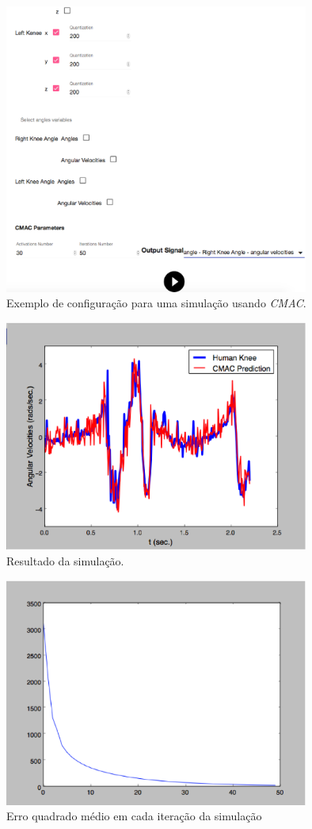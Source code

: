 \begin{figure}[ht]
	\centering
	\includegraphics[width=10cm]{figuras/tela31.eps}
	\caption{Exemplo de configuração para uma simulação usando \emph{CMAC}.}
\label{tela31}
\end{figure}

\begin{figure}[ht]
	\centering
	\includegraphics[width=10cm]{figuras/tela32.eps}
	\caption{Resultado da simulação.}
\label{tela32}
\end{figure}

\begin{figure}[ht]
	\centering
	\includegraphics[width=10cm]{figuras/tela33.eps}
	\caption{Erro quadrado médio em cada iteração da simulação}
\label{tela33}
\end{figure}

